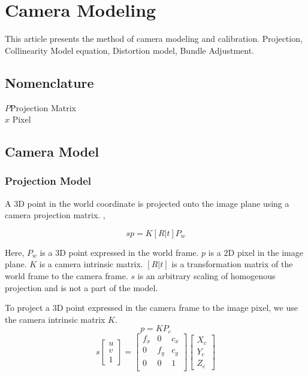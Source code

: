 \chapter{Camera Modeling}

This article presents the method of camera modeling and calibration. Projection, Collinearity Model equation, Distortion model, Bundle Adjustment.

\section*{Nomenclature}
\begin{tabbing}
    $P$\qquad \= Projection Matrix\\
    $x$ \> Pixel\\
\end{tabbing}


\section{Camera Model}
\subsection{Projection Model}
A 3D point in the world coordinate is projected onto the image plane using a camera projection matrix. \cite{calibCameraModels}, \cite{opencvCameraCalibration}


\[
s p = K [R |t ] P_w
\]

Here, $P_w$ is a 3D point expressed in the world frame. $p$ is a 2D pixel in the image plane. $K$ is a camera intrinsic matrix. $[R|t]$ is a transformation matrix of the world frame to the camera frame. $s$ is an arbitrary scaling of homogenous projection and is not a part of the model.

To project a 3D point expressed in the camera frame to the image pixel, we use the camera intrinsic matrix $K$.
\[
p = K P_c
\]
\[
s \begin{bmatrix}
    u \\ v \\ 1
\end{bmatrix} =
\begin{bmatrix}
    f_x & 0 & c_x \\
    0  & f_y& c_y \\
    0  & 0 &  1  \\
\end{bmatrix}
\begin{bmatrix}
    X_c \\ Y_c \\ Z_c
\end{bmatrix}
\]

